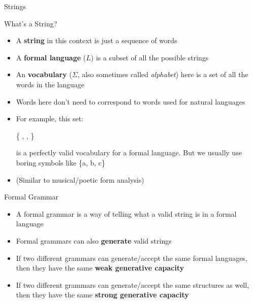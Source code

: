 \documentclass{beamer}
\begin{document}
\begin{frame}{Strings}
\begin{block}{What's a String?}
\begin{itemize}
	\item A \textbf{string} in this context is just a sequence of words
	\pause
	\item A \textbf{formal language} ($L$) is a subset of all the possible strings
	\pause
	\item An \textbf{vocabulary} ($\Sigma$, also sometimes called \textit{alphabet}) here is a set of all the words in the language
	\pause
	\item Words here don't need to correspond to words used for natural languages
	\pause
	\item For example, this set:\\
	\begin{center}
	{\LARGE \{ \Smiley[][cyan], \Springtree, \Snowman \}}\\
	\end{center}
	is a perfectly valid vocabulary for a formal language. \pause But we usually use boring symbols like \{a, b, c\}
	\pause
	\item {\scriptsize (Similar to musical/poetic form analysis)}
\end{itemize}
\end{block}
\end{frame}


\begin{frame}{Formal Grammar}
\begin{block}{}
\begin{itemize}
	\item A formal grammar is a way of telling what a valid string is in a formal language
	\item Formal grammars can also \textbf{generate} valid strings
	\pause
	\item If two different grammars can generate/accept the same formal languages, then they have the same \textbf{weak generative capacity}
	\pause
	\item If two different grammars can generate/accept the same structures as well, then they have the same \textbf{strong generative capacity}
\end{itemize}
\end{block}
\end{frame}
\end{document}
